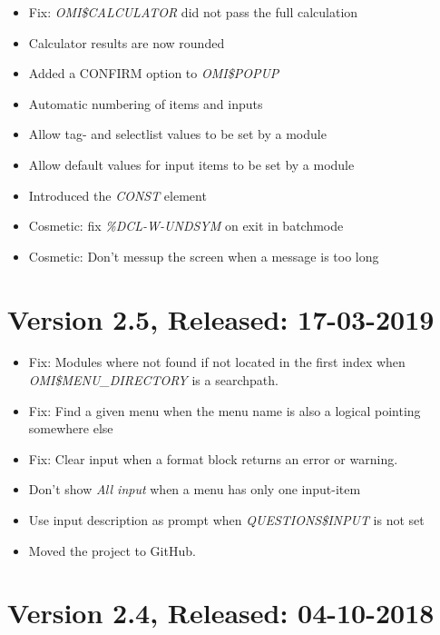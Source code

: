 \documentclass[a4paper]{book}
\begin{document}
\begin{itemize}
\item Fix: \textsl{OMI{\$}CALCULATOR} did not pass the full calculation
\item Calculator results are now rounded
\item Added a CONFIRM option to \textsl{OMI{\$}POPUP}
\item Automatic numbering of items and inputs
\item Allow tag- and selectlist values to be set by a module
\item Allow default values for input items to be set by a module
\item Introduced the \textsl{CONST} element
\item Cosmetic: fix \textsl{\%DCL-W-UNDSYM} on exit in batchmode
\item Cosmetic: Don't messup the screen when a message is too long
\end{itemize}

\section*{Version 2.5, Released: 17-03-2019}

\begin{itemize}
\item Fix: Modules where not found if not located in the first index when \textsl{OMI{\$}MENU{\_}DIRECTORY} is a searchpath.
\item Fix: Find a given menu when the menu name is also a logical pointing somewhere else
\item Fix: Clear input when a format block returns an error or warning.
\item Don't show \textsl{All input} when a menu has only one input-item
\item Use input description as prompt when \textsl{QUESTIONS{\$}INPUT} is not set
\item Moved the project to GitHub.
\end{itemize}

\section*{Version 2.4, Released: 04-10-2018}
\end{document}
